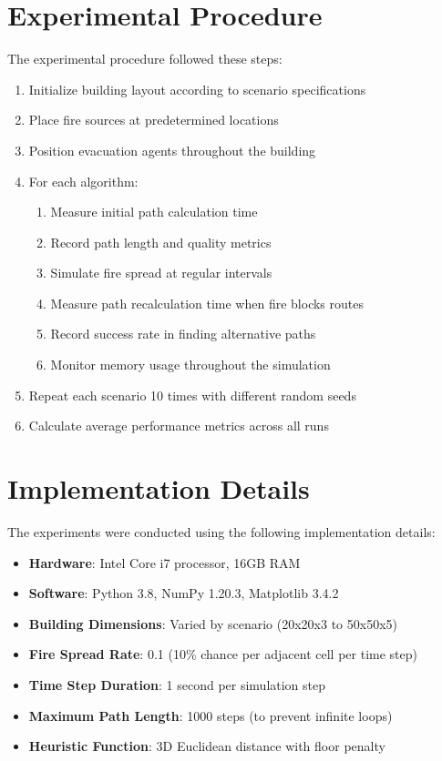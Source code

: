 \documentclass[11pt,a4paper]{report}
\begin{document}
\section{Experimental Procedure}
The experimental procedure followed these steps:

\begin{enumerate}
    \item Initialize building layout according to scenario specifications
    \item Place fire sources at predetermined locations
    \item Position evacuation agents throughout the building
    \item For each algorithm:
    \begin{enumerate}
        \item Measure initial path calculation time
        \item Record path length and quality metrics
        \item Simulate fire spread at regular intervals
        \item Measure path recalculation time when fire blocks routes
        \item Record success rate in finding alternative paths
        \item Monitor memory usage throughout the simulation
    \end{enumerate}
    \item Repeat each scenario 10 times with different random seeds
    \item Calculate average performance metrics across all runs
\end{enumerate}

\section{Implementation Details}
The experiments were conducted using the following implementation details:

\begin{itemize}
    \item \textbf{Hardware}: Intel Core i7 processor, 16GB RAM
    \item \textbf{Software}: Python 3.8, NumPy 1.20.3, Matplotlib 3.4.2
    \item \textbf{Building Dimensions}: Varied by scenario (20x20x3 to 50x50x5)
    \item \textbf{Fire Spread Rate}: 0.1 (10\% chance per adjacent cell per time step)
    \item \textbf{Time Step Duration}: 1 second per simulation step
    \item \textbf{Maximum Path Length}: 1000 steps (to prevent infinite loops)
    \item \textbf{Heuristic Function}: 3D Euclidean distance with floor penalty
\end{itemize}
\end{document}
